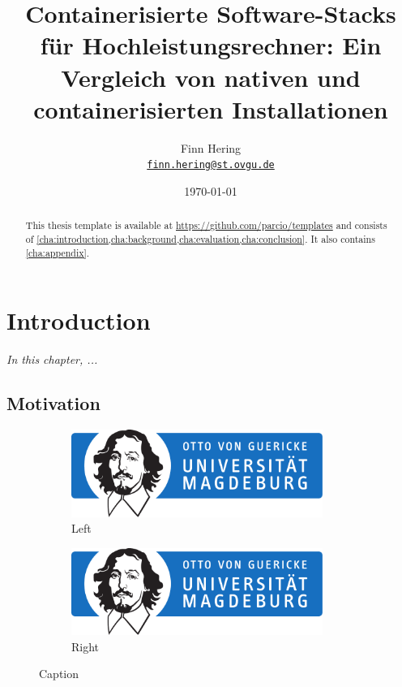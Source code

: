 \documentclass[
	12pt,
	a4paper,
	printlength,
	bibliography=totoc,
	chapterprefix,
	headings=openright,
	numbers=endperiod,
	parskip=half,
	twoside
 ]{scrreprt}
\title{Containerisierte Software-Stacks für Hochleistungsrechner: Ein Vergleich von nativen und containerisierten Installationen}
\author{
Finn Hering\\
{\large\href{mailto:finn.hering@st.ovgu.de}{\nolinkurl{finn.hering@st.ovgu.de}}}
}
\date{\today}
\begin{document}
{}

\maketitle

\begin{abstract}
\lipsum[1]


This thesis template is available at \url{https://github.com/parcio/templates} and consists of \cref{cha:introduction,cha:background,cha:evaluation,cha:conclusion}.
It also contains \cref{cha:appendix}.
\end{abstract}

\tableofcontents

\cleardoubleoddpage
{}

\chapter{Introduction}
\label{cha:introduction}

\textit{In this chapter, ...}

\section{Motivation}

\begin{figure}[ht]
	\centering
	\begin{subfigure}{0.45\textwidth}
		\centering
		\includegraphics[width=0.9\textwidth]{OVGU-INF}
		\caption{Left}
		\label{fig:left}
	\end{subfigure}
	\begin{subfigure}{0.45\textwidth}
		\centering
		\includegraphics[width=0.9\textwidth]{OVGU-INF}
		\caption{Right}
		\label{fig:right}
	\end{subfigure}
	\caption{Caption}
	\label{fig:both}
\end{figure}
\end{document}
